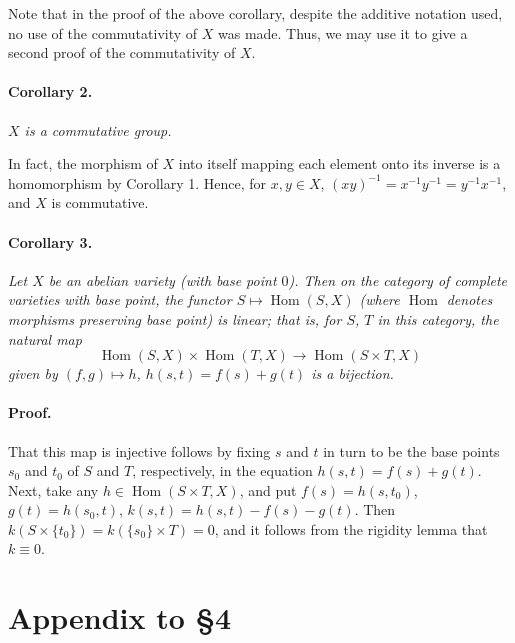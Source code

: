 
\DeclareMathOperator{\Hom}{Hom}


Note that in the proof of the above corollary, despite the additive notation
used, no use of the commutativity of $X$ was made. Thus, we may use it to
give a second proof of the commutativity of $X$.

\paragraph{Corollary 2.}
\textit{$X$ is a commutative group.}

In fact, the morphism of $X$ into itself mapping each element onto its
inverse is a homomorphism by Corollary 1. Hence, for $x, y \in X$,
$(xy)^{-1} = x^{-1} y^{-1} = y^{-1} x^{-1}$, and $X$ is commutative.

\paragraph{Corollary 3.}
\textit{Let $X$ be an abelian variety (with base point $0$). Then on the
category of complete varieties with base point, the functor
$S \longmapsto \Hom(S, X)$ (where $\Hom$ denotes morphisms preserving base
point) is linear; that is, for $S$, $T$ in this category, the natural map}
\[
  \Hom(S, X) \times \Hom(T, X) \longrightarrow \Hom(S \times T, X)
\]
\textit{given by $(f, g) \longmapsto h$, $h(s,t) = f(s) + g(t)$ is a
bijection.}

\paragraph{Proof.}
That this map is injective follows by fixing $s$ and $t$ in turn to be the
base points $s_0$ and $t_0$ of $S$ and $T$, respectively, in the equation
$h(s, t) = f(s) + g(t)$. Next, take any $h \in \Hom(S \times T, X)$, and put
$f(s) = h(s, t_0)$, $g(t) = h(s_0, t)$,
$k(s, t) = h(s, t) - f(s) - g(t)$. Then
$k(S \times \{t_0\}) = k(\{s_0\} \times T) = 0$, and it follows from the
rigidity lemma that $k \equiv 0$.

\section*{Appendix to \S 4}

